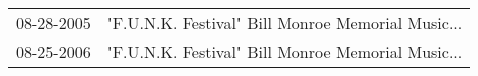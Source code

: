 \begin{supertabular}{ll}
 08-28-2005 &  "F.U.N.K. Festival" Bill Monroe Memorial Music... \\
 08-25-2006 &  "F.U.N.K. Festival" Bill Monroe Memorial Music... \\
\end{supertabular}
